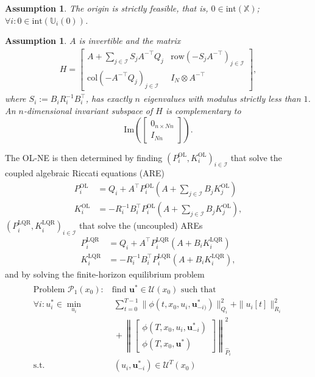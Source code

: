 \documentclass[letterpaper, 10 pt, conference]{ieeeconf}  %
\newcommand{\mc}{\mathcal}
\newcommand{\col}{\mathrm{col}}
\newcommand{\Pol}{P^{\mathrm{OL}}}
\newcommand{\Kol}{K^{\mathrm{OL}}}
\newcommand{\Plqr}{P^{\mathrm{LQR}}}
\newcommand{\Klqr}{K^{\mathrm{LQR}}}
\newcommand{\bu}{\boldsymbol{u}}
\newcommand{\X}{\mathbb{X}}
\newcommand{\U}{\mathbb{U}}
\newcommand{\tsum}{\textstyle\sum}
\newtheorem{assumption}[theorem]{Assumption}
\begin{document}
\begin{assumption}  \label{as:strict_feasibility} The origin is strictly feasible, that is,
    $0\in\mathrm{int}(\X)$; $\forall i: 0\in\mathrm{int}(\U_i(0))$.
\end{assumption}
\begin{assumption} \label{as:symplectic_matrix}
    $A$ is invertible and the matrix
    \begin{align*}
        H = \begin{bmatrix}
            A + \sum_{j\in\mc I}S_jA^{-\top}Q_j & \mathrm{row}(-S_jA^{-\top})_{j\in\mc I} \\
            \col(-A^{-\top}Q_j)_{j\in\mc I} & I_N \otimes A^{-\top}
        \end{bmatrix},
    \end{align*}
    where $S_i:=B_iR_i^{-1}B_i^{\top}$, has exactly $n$ eigenvalues with modulus strictly less than $1$. An $n$-dimensional invariant subspace of $H$ is complementary to
    \begin{equation*}
        \mathrm{Im}\left( \begin{bmatrix}0_{n\times Nn} \\ I_{Nn} \end{bmatrix} \right).
    \end{equation*}
\end{assumption}
The OL-NE is then determined by finding $(\Pol_i, \Kol_i)_{i\in\mc I}$ that solve the coupled algebraic Riccati equations (ARE) \cite{freiling1999}
\begin{align}
    \Pol_i &= Q_i + A^\top\Pol_i(A +\tsum_{j\in\mc I}B_j \Kol_j) \\
    \Kol_i &= -R_i^{-1}B_i^{\top}\Pol_i(A +\tsum_{j\in\mc I}B_j \Kol_j),
\end{align}
$(\Plqr_i, \Klqr_i)_{i\in\mc I}$ that solve the (uncoupled) AREs 
\begin{subequations}
    \begin{align}
        \Plqr_i &= Q_i + A^\top\Plqr_i(A+B_i \Klqr_i)\\
        \Klqr_i &= -R_i^{-1}B_i^{\top}\Plqr_i(A +B_i \Klqr_i),
    \end{align}
\end{subequations}
and by solving the finite-horizon equilibrium problem
\begin{align} \label{eq:finite_hor_problem}
\begin{split}
\text{Problem $\mc P_1(x_0)$:}&~ \text{find $\bu^*\in\mc U(x_0)$ such that}\\ 
    \forall i: u_i^* \in \min_{u_i} &~~\sum_{t=0}^{T-1} \|\phi(t, x_0, u_i, \bu^*_{-i)})\|_{Q_i}^2 + \|u_i[t]\|^2_{R_i} \\ 
    &~~+\left\| \begin{bmatrix}
        \phi(T, x_0, u_i, \bu^*_{-i})\\
        \phi(T, x_0, \bu^*)
    \end{bmatrix} \right\|^2_{\hat{P}_i}\\
    \text{s.t.}&~~ (u_i, \bu^*_{-i})\in\mc U^T(x_0)
\end{split}
\end{align}
\end{document}
